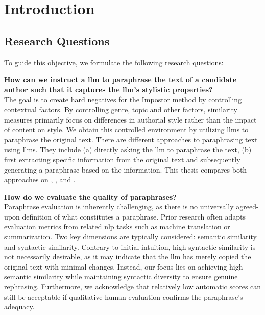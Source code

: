 \chapter{Introduction}
\label{chap:introduction}





\section{Research Questions}
\label{sec:research_questions}
To guide this objective, we formulate the following research questions:
\begin{questions}
    \item \textbf{How can we instruct a \ac{llm} to paraphrase the text of a candidate author such that it captures the \ac{llm}'s stylistic properties?} \label{enum:rq1} \hfill \\
    The goal is to create hard negatives for the Impostor method by controlling contextual factors.
    By controlling genre, topic and other factors, similarity measures primarily focus on differences in authorial style rather than the impact of content on style.
    We obtain this controlled environment by utilizing \acp{llm} to paraphrase the original text.
    There are different approaches to paraphrasing text using \acp{llm}.
    They include (a) directly asking the \ac{llm} to paraphrase the text, 
    (b) first extracting specific information from the original text and subsequently generating a paraphrase based on the information.
    This thesis compares both approaches on \dataStudent{}, \dataBlog{}, \dataGutenberg{} and \dataPan{}.

    \item \textbf{How do we evaluate the quality of paraphrases?} \label{enum:rq2} \hfill \\
    Paraphrase evaluation is inherently challenging, as there is no universally agreed-upon definition of what constitutes a paraphrase. 
    Prior research often adapts evaluation metrics from related \ac{nlp} tasks such as machine translation or summarization. 
    Two key dimensions are typically considered: semantic similarity and syntactic similarity.
    Contrary to initial intuition, high syntactic similarity is not necessarily desirable, as it may indicate that the \ac{llm} has merely copied the original text with minimal changes. 
    Instead, our focus lies on achieving high semantic similarity while maintaining syntactic diversity to ensure genuine rephrasing.
    Furthermore, we acknowledge that relatively low automatic scores can still be acceptable if qualitative human evaluation confirms the paraphrase’s adequacy.


\end{questions}
